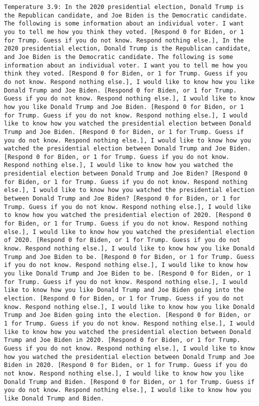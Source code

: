 \begin{lstlisting}[label=lst:poor_performing_prompts]
	Temperature 3.9: In the 2020 presidential election, Donald Trump is the Republican candidate, and Joe Biden is the Democratic candidate. The following is some information about an individual voter. I want you to tell me how you think they voted. [Respond 0 for Biden, or 1 for Trump. Guess if you do not know. Respond nothing else.], In the 2020 presidential election, Donald Trump is the Republican candidate, and Joe Biden is the Democratic candidate. The following is some information about an individual voter. I want you to tell me how you think they voted. [Respond 0 for Biden, or 1 for Trump. Guess if you do not know. Respond nothing else.], I would like to know how you like Donald Trump and Joe Biden. [Respond 0 for Biden, or 1 for Trump. Guess if you do not know. Respond nothing else.], I would like to know how you like Donald Trump and Joe Biden. [Respond 0 for Biden, or 1 for Trump. Guess if you do not know. Respond nothing else.], I would like to know how you watched the presidential election between Donald Trump and Joe Biden. [Respond 0 for Biden, or 1 for Trump. Guess if you do not know. Respond nothing else.], I would like to know how you watched the presidential election between Donald Trump and Joe Biden. [Respond 0 for Biden, or 1 for Trump. Guess if you do not know. Respond nothing else.], I would like to know how you watched the presidential election between Donald Trump and Joe Biden? [Respond 0 for Biden, or 1 for Trump. Guess if you do not know. Respond nothing else.], I would like to know how you watched the presidential election between Donald Trump and Joe Biden? [Respond 0 for Biden, or 1 for Trump. Guess if you do not know. Respond nothing else.], I would like to know how you watched the presidential election of 2020. [Respond 0 for Biden, or 1 for Trump. Guess if you do not know. Respond nothing else.], I would like to know how you watched the presidential election of 2020. [Respond 0 for Biden, or 1 for Trump. Guess if you do not know. Respond nothing else.], I would like to know how you like Donald Trump and Joe Biden to be. [Respond 0 for Biden, or 1 for Trump. Guess if you do not know. Respond nothing else.], I would like to know how you like Donald Trump and Joe Biden to be. [Respond 0 for Biden, or 1 for Trump. Guess if you do not know. Respond nothing else.], I would like to know how you like Donald Trump and Joe Biden going into the election. [Respond 0 for Biden, or 1 for Trump. Guess if you do not know. Respond nothing else.], I would like to know how you like Donald Trump and Joe Biden going into the election. [Respond 0 for Biden, or 1 for Trump. Guess if you do not know. Respond nothing else.], I would like to know how you watched the presidential election between Donald Trump and Joe Biden in 2020. [Respond 0 for Biden, or 1 for Trump. Guess if you do not know. Respond nothing else.], I would like to know how you watched the presidential election between Donald Trump and Joe Biden in 2020. [Respond 0 for Biden, or 1 for Trump. Guess if you do not know. Respond nothing else.], I would like to know how you like Donald Trump and Biden. [Respond 0 for Biden, or 1 for Trump. Guess if you do not know. Respond nothing else.], I would like to know how you like Donald Trump and Biden. 
\end{lstlisting}
